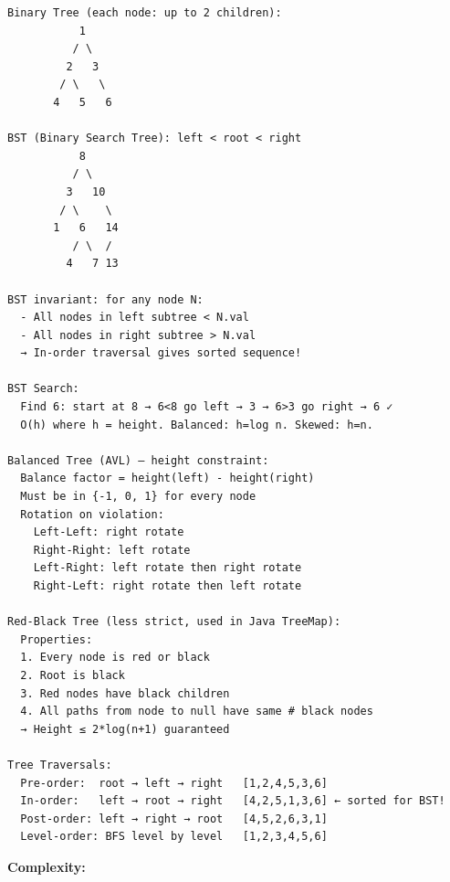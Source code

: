 \documentclass[11pt]{article}
\begin{document}
\begin{verbatim}
Binary Tree (each node: up to 2 children):
           1
          / \
         2   3
        / \   \
       4   5   6

BST (Binary Search Tree): left < root < right
           8
          / \
         3   10
        / \    \
       1   6   14
          / \  /
         4   7 13

BST invariant: for any node N:
  - All nodes in left subtree < N.val
  - All nodes in right subtree > N.val
  → In-order traversal gives sorted sequence!

BST Search:
  Find 6: start at 8 → 6<8 go left → 3 → 6>3 go right → 6 ✓
  O(h) where h = height. Balanced: h=log n. Skewed: h=n.

Balanced Tree (AVL) — height constraint:
  Balance factor = height(left) - height(right)
  Must be in {-1, 0, 1} for every node
  Rotation on violation:
    Left-Left: right rotate
    Right-Right: left rotate
    Left-Right: left rotate then right rotate
    Right-Left: right rotate then left rotate

Red-Black Tree (less strict, used in Java TreeMap):
  Properties:
  1. Every node is red or black
  2. Root is black
  3. Red nodes have black children
  4. All paths from node to null have same # black nodes
  → Height ≤ 2*log(n+1) guaranteed

Tree Traversals:
  Pre-order:  root → left → right   [1,2,4,5,3,6]
  In-order:   left → root → right   [4,2,5,1,3,6] ← sorted for BST!
  Post-order: left → right → root   [4,5,2,6,3,1]
  Level-order: BFS level by level   [1,2,3,4,5,6]
\end{verbatim}

\textbf{Complexity:}
\end{document}
